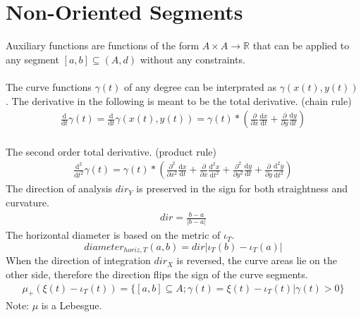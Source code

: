 \documentclass{report}
\begin{document}
\section{Non-Oriented Segments}
Auxiliary functions are functions of the form $A \times A \rightarrow \mathbb{R}$ that can be applied to any segment $[a,b] \subseteq (A,d)$ without any constraints.\\\\
The curve functions $ \gamma (t)$ of any degree can be interprated as $\gamma(x(t),y(t))$. The derivative in the following is meant to be the total derivative. (chain rule)
\begin{align}
\frac{\mathrm{d}}{\mathrm{d} t} \gamma (t) = \frac{\mathrm{d}}{\mathrm{d} t} \gamma (x(t),y(t)) = \gamma(t)* (\frac{\partial}{\partial x}  \frac{\mathrm{d} x}{\mathrm{d}t} + \frac{\partial}{\partial y} \frac{\mathrm{d} y}{\mathrm{d}t})
\end{align}\\
The second order total derivative. (product rule)
\begin{align}
\frac{\mathrm{d}^2}{\mathrm{d}t^2}\gamma(t)= \gamma(t)* (\frac{\partial^2}{\partial x^2}\frac{\mathrm{d}x}{\mathrm{d}t} + \frac{\partial}{\partial x}\frac{\mathrm{d}^2x}{\mathrm{d}t^2} + \frac{\partial^2}{\partial y^2}\frac{\mathrm{d}y}{\mathrm{d}t} + \frac{\partial}{\partial y}\frac{\mathrm{d}^2y}{\mathrm{d}t^2})
\end{align}
The direction of analysis $dir_{Y}$ is preserved in the sign for both straightness and curvature.
\begin{align}
dir = \frac{b-a}{\lvert b-a \rvert}
\end{align}
The horizontal diameter is based on the metric of $\iota_{T}$.
\begin{equation}
diameter_{horiz,T}(a,b)= dir \lvert \iota_{T}(b) - \iota_{T}(a) \rvert
\end{equation}
When the direction of integration $dir_{X}$ is reversed, the curve areas lie on the other side, therefore the direction flips the sign of the curve segments.
\begin{align}
\mu_{+}(\xi(t) -\iota_{T}(t))=\{[a,b] \subseteq A; \gamma(t)=\xi(t) -\iota_{T}(t) \vert \gamma(t)>0\}
\end{align}
Note: $\mu$ is a Lebesgue.
\end{document}
